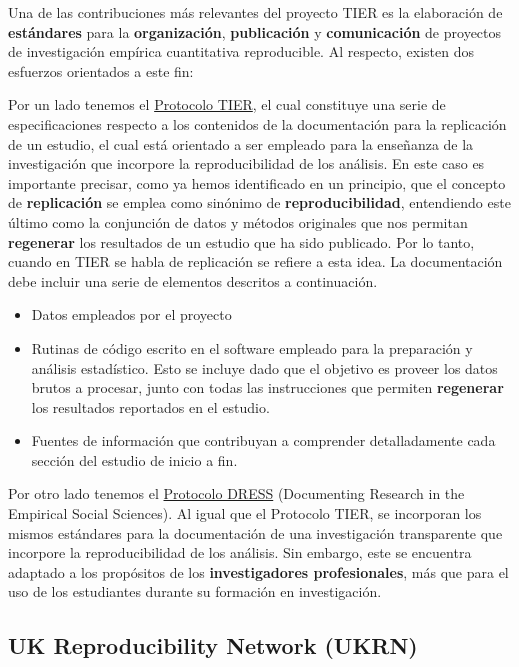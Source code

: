 \documentclass[
  spanish,
  letterpaper,
  DIV=11,
  numbers=noendperiod]{scrreprt}
\begin{document}
Una de las contribuciones más relevantes del proyecto TIER es la
elaboración de \textbf{estándares} para la \textbf{organización},
\textbf{publicación} y \textbf{comunicación} de proyectos de
investigación empírica cuantitativa reproducible. Al respecto, existen
dos esfuerzos orientados a este fin:

Por un lado tenemos el
\href{https://www.projecttier.org/tier-protocol/specifications-3-0/\#overview-of-the-documentation}{Protocolo
TIER}, el cual constituye una serie de especificaciones respecto a los
contenidos de la documentación para la replicación de un estudio, el
cual está orientado a ser empleado para la enseñanza de la investigación
que incorpore la reproducibilidad de los análisis. En este caso es
importante precisar, como ya hemos identificado en un principio, que el
concepto de \textbf{replicación} se emplea como sinónimo de
\textbf{reproducibilidad}, entendiendo este último como la conjunción de
datos y métodos originales que nos permitan \textbf{regenerar} los
resultados de un estudio que ha sido publicado. Por lo tanto, cuando en
TIER se habla de replicación se refiere a esta idea. La documentación
debe incluir una serie de elementos descritos a continuación.

\begin{itemize}
\item
  Datos empleados por el proyecto
\item
  Rutinas de código escrito en el software empleado para la preparación
  y análisis estadístico. Esto se incluye dado que el objetivo es
  proveer los datos brutos a procesar, junto con todas las instrucciones
  que permiten \textbf{regenerar} los resultados reportados en el
  estudio.
\item
  Fuentes de información que contribuyan a comprender detalladamente
  cada sección del estudio de inicio a fin.
\end{itemize}

Por otro lado tenemos el
\href{https://www.projecttier.org/tier-protocol/dress-protocol/}{Protocolo
DRESS} (Documenting Research in the Empirical Social Sciences). Al igual
que el Protocolo TIER, se incorporan los mismos estándares para la
documentación de una investigación transparente que incorpore la
reproducibilidad de los análisis. Sin embargo, este se encuentra
adaptado a los propósitos de los \textbf{investigadores profesionales},
más que para el uso de los estudiantes durante su formación en
investigación.

\subsection{UK Reproducibility Network
(UKRN)}\label{uk-reproducibility-network-ukrn}
\end{document}

